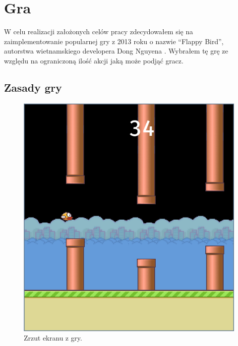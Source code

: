 \documentclass[a4paper, 12pt,twoside]{report}
\begin{document}
\chapter{Gra}
\label{chapter:gra}
W celu realizacji założonych celów pracy zdecydowałem się na zaimplementowanie
popularnej gry z 2013 roku o nazwie ``Flappy Bird'',  autorstwa wietnamskiego
developera Dong Nguyena \cite{flappy_bird_author}. Wybrałem tę grę ze względu na
ograniczoną ilość akcji jaką może podjąć gracz.
\section{Zasady gry} 
\begin{figure}[h] 
	\begin{center}
		\includegraphics[scale=0.40]{flappy_bird.png}
		\caption{Zrzut ekranu z gry.}
		\label{flappy_screenshot}
	\end{center}
\end{figure}
\end{document}
